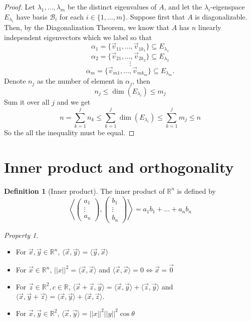 \documentclass{article}
\theoremstyle{definition}
\newtheorem{definition}[theorem]{Definition}
\theoremstyle{remark}
\newtheorem{property}[theorem]{Property}
\begin{document}
\begin{proof}
Let $\lambda_1, \ldots, \lambda_m$ be the distinct eigenvalues of $A$, and let the
$\lambda_i$-eigenspace $E_{\lambda_i}$ have basis $\mathcal{B}_i$ for each
$i \in \{1, \ldots, m\}$. Suppose first that $A$ is diagonalizable.
Then, by the Diagonalization Theorem, we know that $A$ has
$n$ linearly independent eigenvectors which we label so that
\[
\alpha_1=\{\vec{v}_{11}, \ldots, \vec{v}_{1k_1}\} \subseteq E_{\lambda_1}
\]
\[
\alpha_2=\{\vec{v}_{21}, \ldots, \vec{v}_{2k_2}\} \subseteq E_{\lambda_2}
\]
\[
\vdots
\]
\[
\alpha_m=\{\vec{v}_{m1}, \ldots, \vec{v}_{mk_m}\} \subseteq E_{\lambda_m}.
\]
Denote $n_j$ as the number of element in $\alpha_j$, then
\[
n_j\leq \dim(E_{\lambda_i})\leq m_j
\]
Sum it over all $j$ and we get
\[
n=\sum_{k=1}^{j}n_k\leq\sum_{k=1}^{j}\dim(E_{\lambda_i})\leq\sum_{k=1}^{j}m_j\leq n
\]
So the all the inequality must be equal.
\end{proof}

\section{Inner product and orthogonality}
\begin{definition}[Inner product]
    The inner product of $\mathbb{R}^n$ is defined by 
    \[
    \left\langle\begin{pmatrix}
a_1 \\
\vdots \\
a_n
\end{pmatrix},\begin{pmatrix}
b_1 \\
\vdots \\
b_n
\end{pmatrix}\right\rangle=a_1b_1+\dots+a_nb_n
    \]
\end{definition}

\begin{property}
    \begin{itemize}
        \item For $\vec{x},\vec{y}\in\mathbb{R}^n$, $\langle\vec{x},\vec{y}\rangle= \langle\vec{y},\vec{x}\rangle$
        \item For $\vec{x}\in\mathbb{R}^n$, $||x||^2=\langle\vec{x},\vec{x}\rangle$
        and $\langle\vec{x},\vec{x}\rangle=0\iff \vec{x}=\vec{0}$
        \item For $\vec{z}\in\mathbb{R}^2,c\in\mathbb{R}$, $\langle\vec{x}+\vec{z},\vec{y}\rangle=\langle\vec{x},\vec{y}\rangle+\langle\vec{z},\vec{y}\rangle$ and $\langle\vec{x},\vec{y}+\vec{z}\rangle=\langle\vec{x},\vec{y}\rangle+\langle\vec{x},\vec{z}\rangle$.
        \item For $\vec{x},\vec{y}\in\mathbb{R}^2$, $\langle\vec{x},\vec{y}\rangle= ||x||^2||y||^2\cos \theta$
    \end{itemize}
\end{property}
\end{document}
